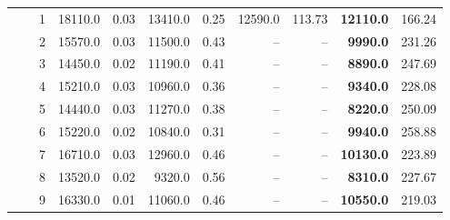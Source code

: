 {\begin{longtable}{ccc|rr|rr|rr|rr}
 &  & 1 & 18110.0 & 0.03 & 13410.0 & 0.25 & 12590.0 & 113.73 & \textbf{12110.0} & 166.24 \\
 &  & 2 & 15570.0 & 0.03 & 11500.0 & 0.43 & -- & -- & \textbf{9990.0} & 231.26 \\
 &  & 3 & 14450.0 & 0.02 & 11190.0 & 0.41 & -- & -- & \textbf{8890.0} & 247.69 \\
 &  & 4 & 15210.0 & 0.03 & 10960.0 & 0.36 & -- & -- & \textbf{9340.0} & 228.08 \\
 &  & 5 & 14440.0 & 0.03 & 11270.0 & 0.38 & -- & -- & \textbf{8220.0} & 250.09 \\
 &  & 6 & 15220.0 & 0.02 & 10840.0 & 0.31 & -- & -- & \textbf{9940.0} & 258.88 \\
 &  & 7 & 16710.0 & 0.03 & 12960.0 & 0.46 & -- & -- & \textbf{10130.0} & 223.89 \\
 &  & 8 & 13520.0 & 0.02 & 9320.0 & 0.56 & -- & -- & \textbf{8310.0} & 227.67 \\
 &  & 9 & 16330.0 & 0.01 & 11060.0 & 0.46 & -- & -- & \textbf{10550.0} & 219.03 \\
\end{longtable}
}
